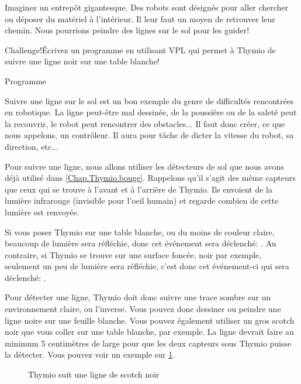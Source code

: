 \label{ch.line}

Imaginez un entrepôt gigantesque. Des robots sont désignés pour aller chercher ou déposer du matériel à l'intérieur. Il leur faut un moyen de retrouver leur chemin. Nous pourrions peindre des lignes sur le sol pour les guider!

\begin{bclogo}[couleur = pink!30, arrondi = 0.1, logo = \bccrayon, ombre = true]{Challenge!}Écrivez un programme en utilisant VPL qui permet à Thymio de suivre une ligne noir sur une table blanche!
\end{bclogo}

{\raggedleft \hfill Programme }

Suivre une ligne sur le sol est un bon exemple du genre de difficultés rencontrées en robotique. La ligne peut-être mal dessinée, de la poussière ou de la saleté peut la recouvrir, le robot peut rencontrer des obstacles... Il faut donc créer, ce que nous appelons,  un contrôleur. Il aura pour tâche de dicter la vitesse du robot, sa direction, etc...


Pour suivre une ligne, nous allons utiliser les détecteurs de sol que nous avons déjà utilisé dans \cref{Chap.Thymio.bouge}. Rappelons qu'il s'agit des même capteurs que ceux qui se trouve à l'avant et à l'arrière de Thymio. Ils envoient de la lumière infrarouge (invisible pour l'oeil humain) et regarde combien de cette lumière est renvoyée.

Si vous poser Thymio sur une table blanche, ou du moins de couleur claire, beaucoup de lumière sera réfléchie, donc cet événement sera déclenché: . Au contraire, si Thymio se trouve sur une surface foncée, noir par exemple, seulement un peu de lumière sera réfléchie, c'est donc cet événement-ci qui sera déclenché: .

Pour détecter une ligne, Thymio doit donc suivre une trace sombre sur un environnement claire, ou l'inverse. Vous pouvez donc dessiner ou peindre une ligne noire sur une feuille blanche. Vous pouvez également utiliser un gros scotch noir que vous coller sur une table blanche, par exemple. La ligne devrait faire au minimum 5 centimètres de large pour que les deux capteurs sous Thymio puisse la détecter. Vous pouvez voir un exemple sur \cref{fig.tape}.

\begin{figure}
\begin{center}
\caption{Thymio suit une ligne de scotch noir}\label{fig.tape}
\end{center}
\end{figure}


